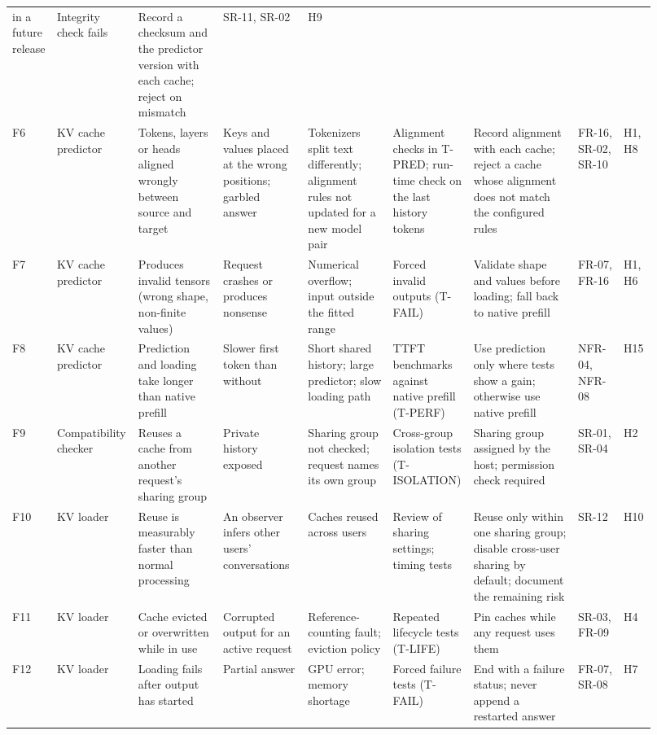 \documentclass{article}
\begin{document}
\begin{landscape}
\begin{longtable}{@{}p{0.04\linewidth}p{0.10\linewidth}p{0.13\linewidth}%
p{0.13\linewidth}p{0.13\linewidth}p{0.11\linewidth}p{0.16\linewidth}%
p{0.07\linewidth}p{0.05\linewidth}@{}}
in a future release & Integrity check fails & Record a checksum and the
predictor version with each cache; reject on mismatch & SR-11, SR-02 &
H9\\
F6 & KV cache predictor & Tokens, layers or heads aligned wrongly between
source and target & Keys and values placed at the wrong positions; garbled
answer & Tokenizers split text differently; alignment rules not updated
for a new model pair & Alignment checks in T-PRED; run-time check on the
last history tokens & Record alignment with each cache; reject a cache whose
alignment does not match the configured rules & FR-16, SR-02, SR-10 & H1,
H8\\
F7 & KV cache predictor & Produces invalid tensors (wrong shape,
non-finite values) & Request crashes or produces nonsense & Numerical
overflow; input outside the fitted range & Forced invalid outputs
(T-FAIL) & Validate shape and values before loading; fall back to native
prefill & FR-07, FR-16 & H1, H6\\
F8 & KV cache predictor & Prediction and loading take longer than native
prefill & Slower first token than without \progname{} & Short shared
history; large predictor; slow loading path & TTFT benchmarks against
native prefill (T-PERF) & Use prediction only where tests show a gain;
otherwise use native prefill & NFR-04, NFR-08 & H15\\
F9 & Compatibility checker & Reuses a cache from another request's sharing
group & Private history exposed & Sharing group not checked; request names
its own group & Cross-group isolation tests (T-ISOLATION) & Sharing group
assigned by the host; permission check required & SR-01, SR-04 & H2\\
F10 & KV loader & Reuse is measurably faster than normal processing & An
observer infers other users' conversations & Caches reused across users &
Review of sharing settings; timing tests & Reuse only within one sharing
group; disable cross-user sharing by default; document the remaining risk &
SR-12 & H10\\
F11 & KV loader & Cache evicted or overwritten while in use & Corrupted
output for an active request & Reference-counting fault; eviction policy &
Repeated lifecycle tests (T-LIFE) & Pin caches while any request uses them
& SR-03, FR-09 & H4\\
F12 & KV loader & Loading fails after output has started & Partial answer
& GPU error; memory shortage & Forced failure tests (T-FAIL) & End with a
failure status; never append a restarted answer & FR-07, SR-08 & H7\\

\end{longtable}
\end{landscape}
\end{document}
